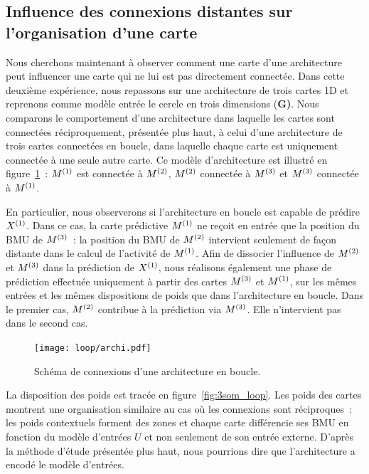 \documentclass[../main]{subfiles}
\begin{document}
\subsection{Influence des connexions distantes sur l'organisation d'une carte}

Nous cherchons maintenant à observer comment une carte d'une architecture peut influencer une carte qui ne lui est pas directement connectée.
Dans cette deuxième expérience, nous repassons sur une architecture de trois cartes 1D et reprenons comme modèle entrée le cercle en trois dimensions (\textbf{G)}. 
Nous comparons le comportement d'une architecture dans laquelle les cartes sont connectées réciproquement, présentée plus haut, à celui d'une architecture de trois cartes connectées en boucle, dans laquelle chaque carte est uniquement connectée à une seule autre carte. 
Ce modèle d'architecture est illustré en figure~\ref{fig:archi_loop}~: $M^{({1})}$ est connectée à $M^{({2})}$, $M^{({2})}$ connectée à $M^{({3})}$ et $M^{({3})}$ connectée à $M^{({1})}$.

En particulier, nous observerons si l'architecture en boucle est capable de prédire $X^{({1})}$. 
Dans ce cas, la carte prédictive $M^{({1})}$ ne reçoit en entrée que la position du BMU de $M^{({3})}$~: la position du BMU de $M^{({2})}$ intervient seulement de façon distante dans le calcul de l'activité de $M^{({1})}$.
Afin de dissocier l'influence de $M^{({2})}$ et $M^{({3})}$ dans la prédiction de $X^{({1})}$, nous réalisons également une phase de prédiction effectuée uniquement à partir des cartes $M^{({3})}$ et $M^{({1})}$, sur les mêmes entrées et les mêmes dispositions de poids que dans l'architecture en boucle.
Dans le premier cas, $M^{({2})}$ contribue à la prédiction via $M^{({3})}$.
Elle n'intervient pas dans le second cas.

\begin{figure}[h!]
	\centering\texttt{[image: loop/archi.pdf]}
	\caption{Schéma de connexions d'une architecture en \og boucle\fg{}. \label{fig:archi_loop}}
\end{figure}

La disposition des poids est tracée en figure~\ref{fig:3som_loop}.
Les poids des cartes montrent une organisation similaire au cas où les connexions sont réciproques~: les poids contextuels forment des zones et chaque carte différencie ses BMU en fonction du modèle d'entrées $U$ et non seulement de son entrée externe.
D'après la méthode d'étude présentée plus haut, nous pourrions dire que l'architecture a encodé le modèle d'entrées.
\end{document}
